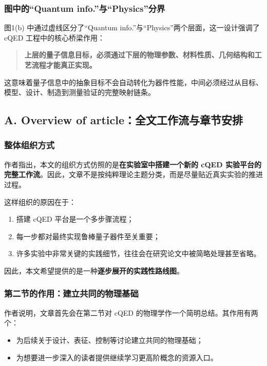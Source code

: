 \documentclass[12pt,a4paper,oneside]{ctexbook}
\begin{document}
\subsubsection{图中的“Quantum info.”与“Physics”分界}

图1(b) 中通过虚线区分了“Quantum info.”与“Physics”两个层面，这一设计强调了 cQED 工程中的核心桥梁作用：

\begin{quote}
\textbf{上层的量子信息目标，必须通过下层的物理参数、材料性质、几何结构和工艺流程才能真正实现。}
\end{quote}

这意味着量子信息中的抽象目标不会自动转化为器件性能，中间必须经过从目标、模型、设计、制造到测量验证的完整映射链条。

\subsection{A. Overview of article：全文工作流与章节安排}

\subsubsection{整体组织方式}

作者指出，本文的组织方式仿照的是\textbf{在实验室中搭建一个新的 cQED 实验平台的完整工作流}。因此，文章不是按纯粹理论主题分类，而是尽量贴近真实实验的推进过程。

这样组织的原因在于：
\begin{enumerate}[leftmargin=2em]
    \item 搭建 cQED 平台是一个多步骤流程；
    \item 每一步都对最终实现鲁棒量子器件至关重要；
    \item 许多实验中非常关键的实践细节，往往会在研究论文中被简略处理甚至省略。
\end{enumerate}

因此，本文希望提供的是一种\textbf{逐步展开的实践性路线图}。

\subsubsection{第二节的作用：建立共同的物理基础}

作者说明，文章首先会在第二节对 cQED 的物理学作一个简明总结。其作用有两个：
\begin{itemize}[leftmargin=2em]
    \item 为后续关于设计、表征、控制等讨论建立共同的物理基础；
    \item 为想要进一步深入的读者提供继续学习更高阶概念的资源入口。
\end{itemize}
\end{document}
